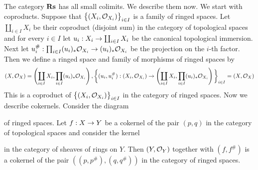 \begin{remark}\label{remark:colimitsinringedspaces}
The category $\mathbf{Rs}$ has all small colimits. We describe them now. We start with coproducts. Suppose that $\big\{(X_i,{\mathcal O}_{X_i})\big\}_{i\in I}$ is a family of ringed spaces. Let $\coprod_{i\in I}X_i$ be their coproduct (disjoint sum) in the category of topological spaces and for every $i\in I$ let $u_i:X_i\rightarrow \coprod_{i\in I}X_i$ be the canonical topological immersion. Next let $u_i^{\#}:\prod_{i\in I}(u_i)_*{\mathcal O}_{X_i}\rightarrow (u_i)_*{\mathcal O}_{X_i}$ be the projection on the $i$-th factor. Then we define a ringed space and family of morphisms of ringed spaces by
$$(X,{\mathcal O}_X) = \left(\coprod_{i\in I}X_i,\prod_{i\in I}(u_i)_*{\mathcal O}_{X_i}\right),\bigg\{(u_i,u_i^{\#}):(X_i,{\mathcal O}_{X_i})\rightarrow \left(\coprod_{i\in I}X_i,\prod_{i\in I}(u_i)_*{\mathcal O}_{X_i}\right)\bigg\}_{i\in I} = (X,{\mathcal O}_X)$$
This is a coproduct of $\big\{(X_i,{\mathcal O}_{X_i})\big\}_{i\in I}$ in the category of ringed spaces. Now we describe cokernels. Consider the diagram
\begin{center}
\end{center}
of ringed spaces. Let $f:X\rightarrow Y$ be a cokernel of the pair $(p,q)$ in the category of topological spaces and consider the kernel
\begin{center}
\end{center}
in the category of sheaves of rings on $Y$. Then $(Y,{\mathcal O}_Y)$ together with $(f,f^{\#})$ is a cokernel of the pair $\left((p,p^{\#}),(q,q^{\#})\right)$ in the category of ringed spaces.
\end{remark}

